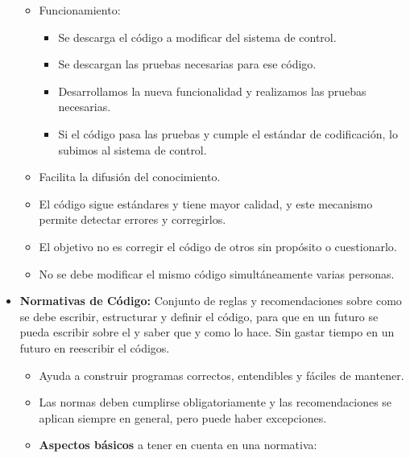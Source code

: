 \documentclass[12pt, twoside, openright]{report} %
\begin{document}
\begin{itemize}
\begin{itemize}
  \item Funcionamiento:
    

    \begin{itemize}
    \item Se descarga el código a modificar del sistema de control.
      
    \item Se descargan las pruebas necesarias para ese código.
      
    \item Desarrollamos la nueva funcionalidad y realizamos las pruebas
      necesarias.
      
    \item Si el código pasa las pruebas y cumple el estándar de
      codificación, lo subimos al sistema de control.
      
    \end{itemize}
  \item Facilita la difusión del conocimiento.
    
  \item El código sigue estándares y tiene mayor calidad, y este mecanismo
    permite detectar errores y corregirlos.
    
  \item El objetivo no es corregir el código de otros sin propósito o
    cuestionarlo.
    
  \item No se debe modificar el mismo código simultáneamente varias
    personas.
    
  \end{itemize}
\item \textbf{Normativas de Código:} Conjunto de reglas y recomendaciones
  sobre como se debe escribir, estructurar y definir el código, para que
  en un futuro se pueda escribir sobre el y saber que y como lo hace.
  Sin gastar tiempo en un futuro en reescribir el códigos.
  

  \begin{itemize}
  \item Ayuda a construir programas correctos, entendibles y fáciles de
    mantener.
    
  \item Las normas deben cumplirse obligatoriamente y las recomendaciones se
    aplican siempre en general, pero puede haber excepciones.
    
  \item \textbf{Aspectos básicos} a tener en cuenta en una normativa:
    


\end{itemize}
\end{itemize}
\end{document}
